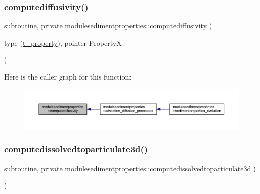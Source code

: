 \subsubsection{\texorpdfstring{computediffusivity()}{computediffusivity()}}
{\footnotesize\ttfamily subroutine, private modulesedimentproperties\+::computediffusivity (\begin{DoxyParamCaption}\item[{type (\mbox{\hyperlink{structmodulesedimentproperties_1_1t__property}{t\+\_\+property}}), pointer}]{PropertyX }\end{DoxyParamCaption})\hspace{0.3cm}{\ttfamily [private]}}

Here is the caller graph for this function\+:\nopagebreak
\begin{figure}[H]
\begin{center}
\leavevmode
\includegraphics[width=350pt]{namespacemodulesedimentproperties_a1bb06862669d539399995d64ea159fde_icgraph}
\end{center}
\end{figure}
\mbox{\label{namespacemodulesedimentproperties_ad4fd225155211238920de3285f222390}} 
\subsubsection{\texorpdfstring{computedissolvedtoparticulate3d()}{computedissolvedtoparticulate3d()}}
{\footnotesize\ttfamily subroutine, private modulesedimentproperties\+::computedissolvedtoparticulate3d (\begin{DoxyParamCaption}{ }\end{DoxyParamCaption})\hspace{0.3cm}{\ttfamily [private]}}

